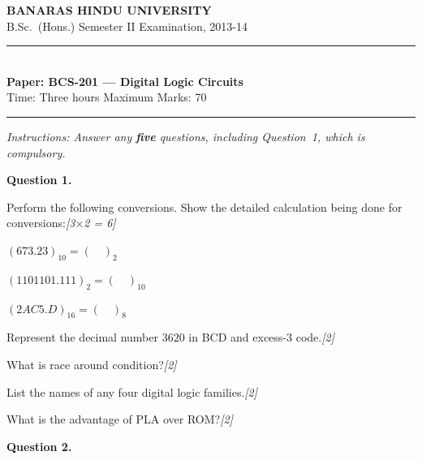 \documentclass[11pt,a4paper]{article}
\newcommand{\pts}[1]{\hfill   \textit{[#1]}}
\begin{document}
\begin{center}
  {\large\bfseries BANARAS HINDU UNIVERSITY}\\[2pt]
  {
\normalsize B.Sc.\ (Hons.) Semester II Examination, 2013-14}\\[6pt]
  \rule{0.8\linewidth}{0.5pt}\\[6pt]
  {\large\bfseries Paper: BCS-201 --- Digital Logic Circuits}\\[4pt]
  {
\normalsize Time: Three hours \hfill Maximum Marks: 70}
\end{center}

\rule{\linewidth}{0.4pt}

\smallskip



\noindent   \textit{Instructions: Answer any   \textbf{five} questions, including Question~1, which is compulsory.}

\bigskip




\noindent   \textbf{Question 1.}

\begin{parts}
  \item Perform the following conversions. Show the detailed calculation being done for conversions:\pts{3$ \times$2 = 6}
  
\begin{parts}
    \item $(673.23)_{10} = (\quad)_2$
    \item $(1101101.111)_2 = (\quad)_{10}$
    \item $(2AC5.D)_{16} = (\quad)_8$
  \end{parts}
  \item Represent the decimal number $3620$ in BCD and excess-3 code.\pts{2}
  \item What is race around condition?\pts{2}
  \item List the names of any four digital logic families.\pts{2}
  \item What is the advantage of PLA over ROM?\pts{2}
\end{parts}

\bigskip




\noindent   \textbf{Question 2.}
\end{document}
